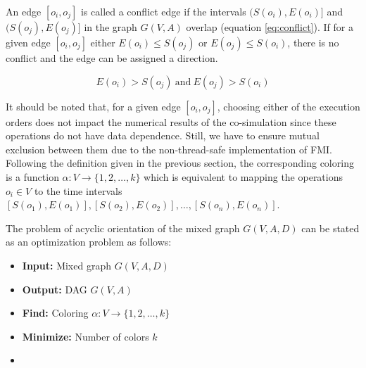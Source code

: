 An edge $[o_i,o_j]$ is called a conflict edge if the intervals $(S(o_i), E(o_i)]$ and $(S(o_j), E(o_j)]$ in the graph $G(V,A)$ overlap (equation \ref{eq:conflict}). If for a given edge $[o_i,o_j]$ either $E(o_i) \leq S(o_j)$ or $E(o_j) \leq S(o_i)$, there is no conflict and the edge can be assigned a direction. 

\begin{equation}
E(o_i) > S(o_j)\ \text{and}\ E(o_j) > S(o_i)
\label{eq:conflict}
\end{equation}

It should be noted that, for a given edge $[o_i, o_j]$, choosing either of the execution orders does not impact the numerical results of the co-simulation since these operations do not have data dependence. Still, we have to ensure mutual exclusion between them due to the non-thread-safe implementation of FMI. Following the definition given in the previous section, the corresponding coloring is a function $\alpha: V \rightarrow \{1, 2, \ldots, k\}$ which is equivalent to mapping the operations $o_i \in V$ to the time intervals $[S(o_1), E(o_1)], [S(o_2), E(o_2)], \ldots, [S(o_n), E(o_n)]$.

The problem of acyclic orientation of the mixed graph $G(V,A,D)$ can be stated as an optimization problem as follows:

\begin{itemize}[label={},topsep=1pt,parsep=1pt,partopsep=1pt,leftmargin=*]	
\item \textbf{Input:} Mixed graph $G(V,A,D)$
\item \textbf{Output:} DAG $G(V,A)$
\item \textbf{Find:} Coloring $\alpha: V \rightarrow \{1, 2, \ldots, k\}$
\item \textbf{Minimize:} Number of colors $k$
\item {}
\end{itemize}

